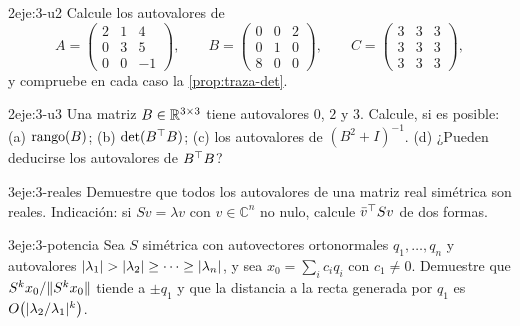 \begin{ejercicio}{2}{eje:3-u2}
Calcule los autovalores de
\[
A=\begin{pmatrix}2&1&4\\0&3&5\\0&0&-1\end{pmatrix},\qquad
B=\begin{pmatrix}0&0&2\\0&1&0\\8&0&0\end{pmatrix},\qquad
C=\begin{pmatrix}3&3&3\\3&3&3\\3&3&3\end{pmatrix},
\]
y compruebe en cada caso la \cref{prop:traza-det}.
\end{ejercicio}

\begin{ejercicio}{2}{eje:3-u3}
Una matriz $B\in\mathbb{R}^{3\times 3}$ tiene autovalores $0$, $2$ y $3$. Calcule, si es posible: (a) $\operatorname{rango}(B)$; (b) $\det(B^{\top} B)$; (c) los autovalores de $(B^{2}+I)^{-1}$. (d) ¿Pueden deducirse los autovalores de $B^{\top} B$?
\end{ejercicio}

\begin{ejercicio}{3}{eje:3-reales}
Demuestre que todos los autovalores de una matriz real simétrica son reales. Indicación: si $Sv=\lambda v$ con $v\in\mathbb{C}^{n}$ no nulo, calcule $\bar v^{\top} Sv$ de dos formas.
\end{ejercicio}

\begin{ejercicio}{3}{eje:3-potencia}
Sea $S$ simétrica con autovectores ortonormales $q_1,\dots,q_n$ y autovalores $\lvert\lambda_1\rvert>\lvert\lambda_2\rvert\ge\dots\ge\lvert\lambda_n\rvert$, y sea $x_0=\sum_i c_iq_i$ con $c_1\ne 0$. Demuestre que $S^{k}x_0/\lVert S^{k}x_0\rVert$ tiende a $\pm q_1$ y que la distancia a la recta generada por $q_1$ es $O\bigl(\lvert\lambda_2/\lambda_1\rvert^{k}\bigr)$.
\end{ejercicio}
